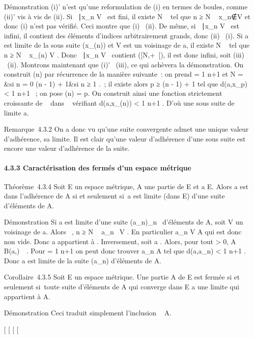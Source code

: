 \documentclass[]{article}
\begin{document}
Démonstration (i)' n'est qu'une reformulation de (i) en termes de
boules, comme (ii)' vis à vis de (ii). Si \n \in
{}~∣x\_n \in V \ est
fini, il existe N \in {}~ tel que n ≥ N \rigtharrow~
x\_n∉V et donc (i) n'est pas vérifié.
Ceci montre que (i) \rigtharrow~(ii). De même, si \n \in
{}~∣x\_n \in V \ est
infini, il contient des éléments d'indices arbitrairement grands, donc
(ii) \rigtharrow~(i). Si a est limite de la sous suite (x\_\phi(n)) et V est
un voisinage de a, il existe N \in {}~ tel que n ≥ N \rigtharrow~ x\_\phi(n) \in V .
Donc \n \in {}~∣x\_n \in V
\ contient \phi({[}N,+\infty~{[}), il est donc infini, soit
(iii) \rigtharrow~(ii). Montrons maintenant que (i)' \rigtharrow~(iii), ce qui achèvera la
démonstration. On construit \phi(n) par récurrence de la manière suivante~:
on prend \epsilon = 1 \over n+1 et N = \left
\  &si n = 0
\cr \phi(n - 1) + 1&si n ≥ 1 \cr 
\right .~; il existe alors p ≥ \phi(n - 1) + 1 tel que
d(a,x\_p) \textless{} 1 \over n+1 ~; on pose
\phi(n) = p. On construit ainsi une fonction strictement croissante de ~
dans ~ vérifiant d(a,x\_\phi(n)) \textless{} 1
\over n+1 . D'où une sous suite de limite a.

Remarque~4.3.2 On a donc vu qu'une suite convergente admet une unique
valeur d'adhérence, sa limite. Il est clair qu'une valeur d'adhérence
d'une sous suite est encore une valeur d'adhérence de la suite.

\paragraph{4.3.3 Caractérisation des fermés d'un espace métrique}

Théorème~4.3.4 Soit E un espace métrique, A une partie de E et a \in E.
Alors a est dans l'adhérence de A si et seulement si~a est limite (dans
E) d'une suite d'éléments de A.

Démonstration Si a est limite d'une suite (a\_n)\_n\in{}~
d'éléments de A, soit V un voisinage de a. Alors
\existsN \in {}~, n ≥ N \rigtharrow~ a\_n~ \in V . En
particulier a\_n \in V \bigcap A qui est donc non vide. Donc a
appartient à \overlineA. Inversement, soit a
\in\overlineA. Alors, pour tout \epsilon \textgreater{} 0, A \bigcap
B(a,\epsilon)\neq~\varnothing~. Pour \epsilon = 1 \over
n+1 on peut donc trouver a\_n \in A tel que d(a,a\_n)
\textless{} 1 \over n+1 . Donc a est limite de la
suite (a\_n) d'éléments de A.

Corollaire~4.3.5 Soit E un espace métrique. Une partie A de E est fermée
si et seulement si~toute suite d'éléments de A qui converge dans E a une
limite qui appartient à A.

Démonstration Ceci traduit simplement l'inclusion
\overlineA \subset~ A.

{[}
{[}
{[}
{[}
\end{document}
